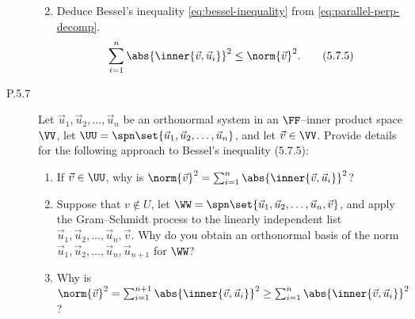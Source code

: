 \documentclass{homework}
\begin{document}
\begin{description}
\begin{enumerate}
    \begin{solution}

    \end{solution}

  \item Deduce Bessel's inequality \eqref{eq:bessel-inequality} from
    \eqref{eq:parallel-perp-decomp}.
    \[
      \sum_{i=1}^n \abs{\inner{\vec v, \vec u_i}}^2 \le
      \norm{\vec v}^2.
      \tag{5.7.5}
      \label{eq:bessel-inequality}
    \]

    \begin{solution}

    \end{solution}
  \end{enumerate}

\item[P.5.7]
  Let \(\vec u_1, \vec u_2, \dots, \vec u_n\) be an orthonormal system
  in an \(\FF\)--inner product space \(\VV\), let
  \(\UU = \spn\set{\vec u_1, \vec u_2, \dots, \vec u_n}\), and let
  \(\vec v \in \VV\).  Provide details for the following approach to
  Bessel's inequality (5.7.5):
  \begin{enumerate}
  \item If \(\vec v \in \UU\), why is
    \(\norm{\vec v}^2 = \sum_{i=1}^n \abs{\inner{\vec v, \vec
        u_i}}^2\)?

    \begin{solution}

    \end{solution}

  \item Suppose that \(v \not\in U\), let
    \(\WW = \spn\set{\vec u_1, \vec u_2, \dots, \vec u_n, \vec v}\),
    and apply the Gram--Schmidt process to the linearly independent
    list \(\vec u_1, \vec u_2, \dots, \vec u_n, \vec v\).  Why do you
    obtain an orthonormal basis of the norm
    \(\vec u_1, \vec u_2, \dots, \vec u_n, \vec u_{n+1}\) for \(\WW\)?

    \begin{solution}

    \end{solution}

  \item Why is
    \(\norm{\vec v}^2 = \sum_{i=1}^{n+1} \abs{\inner{\vec v, \vec
        u_i}}^2 \ge \sum_{i=1}^n \abs{\inner{\vec v, \vec u_i}}^2\)?

    \begin{solution}

    \end{solution}
  \end{enumerate}
\end{description}
\end{document}
